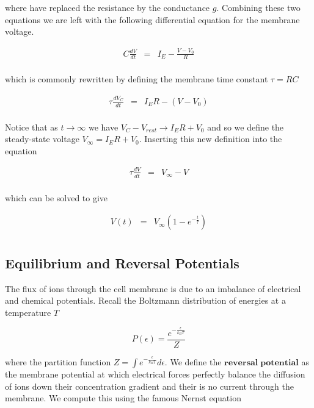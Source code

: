 \documentclass[a4paper,11pt]{book}
\begin{document}
where have replaced the resistance by the conductance $g$. Combining these two equations we are left with the following differential equation for the membrane voltage.

\begin{eqnarray*}
C\frac{dV}{dt} &=& I_{E} - \frac{V - V_{0}}{R}\\
\end{eqnarray*}

which is commonly rewritten by defining the membrane time constant $\tau = RC$

\begin{eqnarray*}
\tau\frac{dV_{C}}{dt} &=& I_{E}R - (V - V_{0})\\
\end{eqnarray*}

Notice that as $t\rightarrow \infty$ we have $V_{C}-V_{rest} \rightarrow I_{E}R + V_{0}$ and so we define the steady-state voltage $V_{\infty} = I_{E}R + V_{0}$. Inserting this new definition into the equation

\begin{eqnarray*}
\tau\frac{dV}{dt} &=& V_{\infty} - V\\
\end{eqnarray*}

which can be solved to give

\begin{eqnarray*}
V(t) &=& V_{\infty}(1-e^{-\frac{t}{\tau}})\\
\end{eqnarray*}

\subsection{Equilibrium and Reversal Potentials}

The flux of ions through the cell membrane is due to an imbalance of electrical and chemical potentials. Recall the Boltzmann distribution of energies at a temperature $T$

\begin{equation*}
P(\epsilon) = \frac{e^{-\frac{\epsilon}{k_{B}T}}}{Z}
\end{equation*}

where the partition function $Z= \int e^{-\frac{\epsilon}{k_{B}T}}d\epsilon$. We define the $\mathbf{reversal\; potential}$ as the membrane potential at which electrical forces perfectly balance the diffusion of ions down their concentration gradient and their is no current through the membrane. We compute this using the famous Nernst equation
\end{document}
